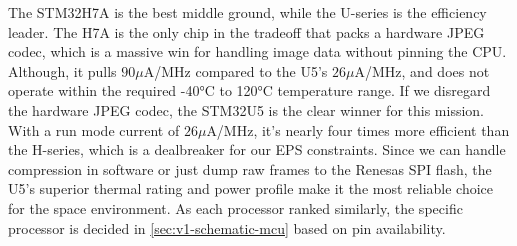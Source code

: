 The STM32H7A is the best middle ground, while the U-series is the efficiency leader. The H7A is the only chip in the tradeoff that packs a hardware JPEG codec, which is a massive win for handling image data without pinning the CPU. Although, it pulls $90\mu$A/MHz compared to the U5's $26\mu$A/MHz, and does not operate within the required -40°C to 120°C temperature range.
\nl
If we disregard the hardware JPEG codec, the STM32U5 is the clear winner for this mission. With a run mode current of $26\mu$A/MHz, it's nearly four times more efficient than the H-series, which is a dealbreaker for our EPS constraints. Since we can handle compression in software or just dump raw frames to the Renesas SPI flash, the U5's superior thermal rating and power profile make it the most reliable choice for the space environment. As each processor ranked similarly, the specific processor is decided in \autoref{sec:v1-schematic-mcu} based on pin availability.